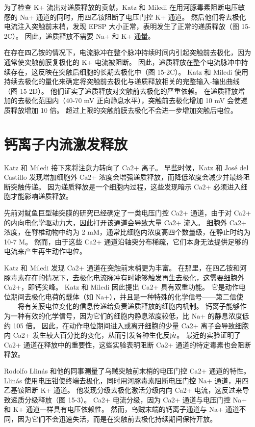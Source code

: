 为了检查 K+ 流出对递质释放的贡献，Katz 和 Miledi 在用河豚毒素阻断电压敏感的 Na+ 通道的同时，用四乙铵阻断了电压门控 K+ 通道。 然后他们将去极化电流注入突触前末梢，发现 EPSP 大小正常，表明发生了正常的递质释放（图 15-2C）。 因此，递质释放不需要 Na+ 和 K+ 通量。

在存在四乙铵的情况下，电流脉冲在整个脉冲持续时间内引起突触前去极化，因为通常使突触前膜复极化的 K+ 电流被阻断。 因此，递质释放在整个电流脉冲中持续存在，这反映在突触后细胞的长期去极化中（图 15-2C）。 Katz 和 Miledi 使用持续去极化的量化来确定将突触前去极化与递质释放相关的完整输入-输出曲线（图 15-2D）。 他们证实了递质释放对突触前去极化的严重依赖。 在递质释放增加的去极化范围内（40-70 mV 正向静息水平），突触前去极化增加 10 mV 会使递质释放增加 10 倍。 超过上限的突触前膜去极化不会进一步增加突触后电位。

\section{钙离子内流激发释放}
Katz 和 Miledi 接下来将注意力转向了 Ca2+ 离子。 早些时候，Katz 和 José del Castillo 发现增加细胞外 Ca2+ 浓度会增强递质释放，而降低浓度会减少并最终阻断突触传递。 因为递质释放是一个细胞内过程，这些发现暗示 Ca2+ 必须进入细胞才能影响递质释放。

先前对鱿鱼巨型轴突膜的研究已经确定了一类电压门控 Ca2+ 通道，由于对 Ca2+ 的内向电化学驱动力大，因此打开该通道会导致大量 Ca2+ 流入。 细胞外 Ca2+ 浓度，在脊椎动物中约为 2 mM，通常比细胞内浓度高四个数量级，在静止时约为 10-7 M。 然而，由于这些 Ca2+ 通道沿轴突分布稀疏，它们本身无法提供足够的电流来产生再生动作电位。

Katz 和 Miledi 发现 Ca2+ 通道在突触前末梢更为丰富。 在那里，在四乙铵和河豚毒素存在的情况下，去极化电流脉冲有时能够触发再生去极化，这需要细胞外 Ca2+，即钙尖峰。 Katz 和 Miledi 因此提出 Ca2+ 具有双重功能。 它是动作电位期间去极化电荷的载体（如 Na+），并且是一种特殊的化学信号——第二信使——将有关膜电位变化的信息传递给负责递质释放的细胞内机制。 钙离子能够作为一种有效的化学信号，因为它们的细胞内静息浓度较低，比 Na+ 的静息浓度低约 105 倍。 因此，在动作电位期间进入或离开细胞的少量 Ca2+ 离子会导致细胞内 Ca2+ 发生较大百分比的变化，从而引发各种生化反应。 最近的实验证明了 Ca2+ 通道在释放中的重要性，这些实验表明阻断 Ca2+ 通道的特定毒素也会阻断释放。

Rodolfo Llinás 和他的同事测量了乌贼突触前末梢的电压门控 Ca2+ 通道的特性。 Llinás 使用电压钳使终端去极化，同时用河豚毒素阻断电压门控 Na+ 通道，用四乙基铵阻断 K+ 通道。 他发现分级去极化激活分级内向 Ca2+ 电流，这反过来导致递质分级释放（图 15-3）。 Ca2+ 电流分级，因为 Ca2+ 通道与电压门控 Na+ 和 K+ 通道一样具有电压依赖性。 然而，乌贼末端的钙离子通道与 Na+ 通道不同，因为它们不会迅速失活，而是在突触前去极化持续期间保持开放。

